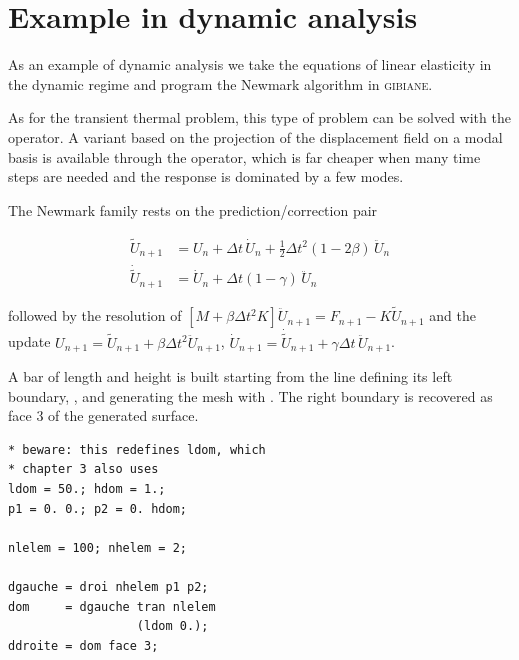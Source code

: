 \section{Example in dynamic analysis}

%
%
%
As an example of dynamic analysis we take the equations of linear elasticity
in the dynamic regime and program the Newmark algorithm in \textsc{gibiane}.

As for the transient thermal problem, this type of problem can be solved with
the  operator. A variant based on the projection of the
displacement field on a modal basis is available through the 
operator, which is far cheaper when many time steps are needed and the
response is dominated by a few modes.

The Newmark family rests on the prediction/correction pair

\begin{align}
\tilde{U}_{n+1} &= U_{n} + \Delta t\,\dot{U}_{n}
   + \tfrac{1}{2}\Delta t^{2}(1-2\beta)\,\ddot{U}_{n} \\
\dot{\tilde{U}}_{n+1} &= \dot{U}_{n} + \Delta t (1-\gamma)\,\ddot{U}_{n}
\end{align}

\noindent followed by the resolution of
$\left[M+\beta\Delta t^{2}K\right]\ddot{U}_{n+1}
 = F_{n+1}-K\tilde{U}_{n+1}$
and the update
$U_{n+1}=\tilde{U}_{n+1}+\beta\Delta t^{2}\ddot{U}_{n+1}$,
$\dot{U}_{n+1}=\dot{\tilde{U}}_{n+1}+\gamma\Delta t\,\ddot{U}_{n+1}$.

\begin{castemcom}
A bar of length  and height  is built starting from the line
defining its left boundary, , and generating the mesh with
. The right boundary is recovered as face 3 of the
generated surface.
\end{castemcom}
\begin{castemlines}
\begin{verbatim}
* beware: this redefines ldom, which
* chapter 3 also uses
ldom = 50.; hdom = 1.;
p1 = 0. 0.; p2 = 0. hdom;

nlelem = 100; nhelem = 2;

dgauche = droi nhelem p1 p2;
dom     = dgauche tran nlelem
                  (ldom 0.);
ddroite = dom face 3;
\end{verbatim}
\end{castemlines}

